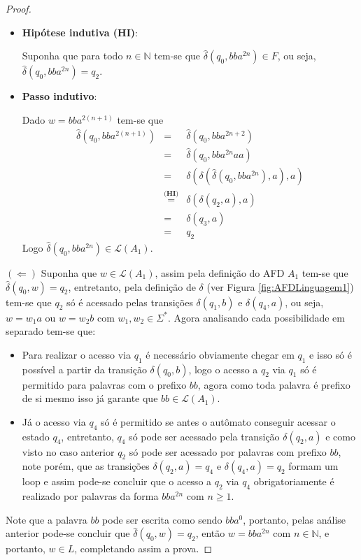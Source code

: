 \begin{exem}
\begin{proof}
\begin{itemize}
			\item \textbf{Hipótese indutiva (HI)}:
			
			Suponha que para todo $n \in \mathbb{N}$ tem-se que $\widehat{\delta}(q_0, bba^{2n}) \in F$, ou seja, $\widehat{\delta}(q_0, bba^{2n}) = q_2$.
			
			\item \textbf{Passo indutivo}:
			
			Dado $w = bba^{2(n+1)}$ tem-se que
			\begin{eqnarray*}
				\widehat{\delta}(q_0, bba^{2(n+1)}) & = & \widehat{\delta}(q_0, bba^{2n + 2})\\
				& = & \widehat{\delta}(q_0, bba^{2n}aa)\\
				& = & \delta(\delta(\widehat{\delta}(q_0, bba^{2n}), a), a)\\
				& \stackrel{\textbf{(HI)}}{=} & \delta(\delta(q_2, a), a)\\
				& = & \delta(q_3, a)\\
				& = & q_2
			\end{eqnarray*} 
			Logo $\widehat{\delta}(q_0, bba^{2n}) \in \mathcal{L}(A_1)$.
		\end{itemize} 
		$(\Leftarrow)$ Suponha que $w \in \mathcal{L}(A_1)$, assim pela definição do AFD $A_1$ tem-se que $\widehat{\delta}(q_0, w) = q_2$, entretanto, pela definição de $\delta$ (ver Figura \ref{fig:AFDLinguagem1}) tem-se que $q_2$ só é acessado pelas transições $\delta(q_1, b)$ e $\delta(q_4, a)$, ou seja, $w = w_1a$ ou $w = w_2b$ com $w_1, w_2 \in \Sigma^*$. Agora analisando cada possibilidade em separado tem-se que: 
		\begin{itemize}
			\item Para realizar o acesso via $q_1$ é necessário obviamente chegar em $q_1$ e isso só é possível a partir da transição $\delta(q_0, b)$, logo o acesso a $q_2$ via $q_1$ só é permitido para palavras com o prefixo $bb$, agora como toda palavra é prefixo de si mesmo isso já garante que $bb \in \mathcal{L}(A_1)$.
			\item Já o acesso via $q_4$ só é permitido se antes o autômato conseguir acessar o estado $q_4$, entretanto, $q_4$ só pode ser acessado pela transição $\delta(q_2, a)$ e como visto no caso anterior $q_2$ só pode ser acessado por palavras com prefixo $bb$, note porém, que as transições $\delta(q_2, a) = q_4$ e $\delta(q_4, a) = q_2$ formam um loop e assim pode-se concluir que o acesso a $q_2$ via $q_4$ obrigatoriamente é realizado por palavras da forma $bba^{2n}$ com $n \geq 1$.
		\end{itemize}
		Note que a palavra $bb$ pode ser escrita como sendo $bba^0$, portanto, pelas análise anterior pode-se concluir que $\widehat{\delta}(q_0, w) = q_2$, então $w = bba^{2n}$ com $n \in \mathbb{N}$, e portanto, $w \in L$, completando assim a prova. 
	\end{proof}
\end{exem}

